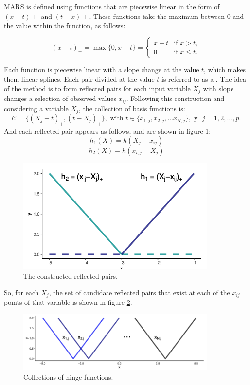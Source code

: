 MARS is defined using functions that are piecewise linear in the form of $(x - t)+$ and $(t - x)+$. These functions take the maximum between 0 and the value within the function, as follows:

$$
(x - t)_+ = \max\{ 0, x - t \}= \begin{cases} 
	x - t &\mbox{if } x > t, \\
	0 & \mbox{if } x \leq t. \end{cases}
$$

Each function is piecewise linear with a slope change at the value $t$, which makes them linear splines. Each pair divided at the value $t$ is referred to as a . The idea of the method is to form reflected pairs for each input variable $X_j$ with slope changes a selection of observed values $x_{ij}$. Following this construction and considering a variable $X_j$, the collection of basis functions is:
$$
\mathcal{C} = \{ (X_j - t)_+, (t - X_j)_+ \}, \text{ with } t \in \{ x_{1,j}, x_{2,j}, \ldots x_{N,j} \}, \text{ y } \,\, j = 1,2, \ldots , p.
$$
And each reflected pair appears as follows, and are shown in figure \ref{reflected_pairs}: 
$$
h_1(X) = h(X_j - x_{ij}) 
$$
$$
h_2(X) = h(x_{i,j} - X_j)
$$
\begin{figure}[h]
	\includegraphics[width=10cm]{Figures/3ref_pair.png}
	\centering
	\caption{The constructed reflected pairs.}
	\label{reflected_pairs}
\end{figure}
So, for each $X_j$, the set of candidate reflected pairs that exist at each of the $x_{ij}$ points of that variable is shown in figure \ref{hinges}. 
\begin{figure}[h]
	\includegraphics[width=10cm]{Figures/3hinge.png}
	\centering
	\caption{Collections of hinge functions.}
	\label{hinges}
\end{figure}

